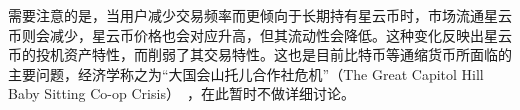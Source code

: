 

需要注意的是，当用户减少交易频率而更倾向于长期持有星云币时，市场流通星云币则会减少，星云币价格也会对应升高，但其流动性会降低。这种变化反映出星云币的投机资产特性，而削弱了其交易特性。这也是目前比特币等通缩货币所面临的主要问题，经济学称之为“大国会山托儿合作社危机”（The Great Capitol Hill Baby Sitting Co-op Crisis）~\cite{hens2007great}，在此暂时不做详细讨论。


